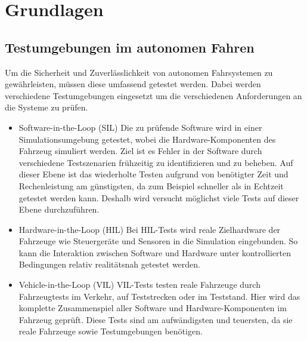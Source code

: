 \chapter{Grundlagen}

\section{Testumgebungen im autonomen Fahren}
Um die Sicherheit und Zuverlässlichkeit von autonomen Fahrsystemen zu gewährleisten, müssen diese umfassend getestet werden. 
Dabei werden verschiedene Testumgebungen eingesetzt um die verschiedenen Anforderungen an die Systeme zu prüfen. 

\begin{itemize}
    \item Software-in-the-Loop (SIL) \newline
            Die zu prüfende Software wird in einer Simulationsumgebung getestet, wobei die Hardware-Komponenten des Fahrzeug simuliert werden. 
            Ziel ist es Fehler in der Software durch verschiedene Testszenarien frühzeitig zu identifizieren und zu beheben.
            Auf dieser Ebene ist das wiederholte Testen aufgrund von benötigter Zeit und Rechenleistung am günstigsten, da zum Beispiel schneller als in Echtzeit getestet werden kann. 
            Deshalb wird versucht möglichst viele Tests auf dieser Ebene durchzuführen.
    \item Hardware-in-the-Loop (HIL) \newline
            Bei HIL-Tests wird reale Zielhardware der Fahrzeuge wie Steuergeräte und Sensoren in die Simulation eingebunden. 
            So kann die Interaktion zwischen Software und Hardware unter kontrollierten Bedingungen relativ realitätsnah getestet werden.
    \item Vehicle-in-the-Loop (VIL) \newline
            VIL-Tests testen reale Fahrzeuge durch Fahrzeugtests im Verkehr, auf Teststrecken oder im Teststand. 
            Hier wird das komplette Zusammenspiel aller Software und Hardware-Komponenten im Fahrzeug geprüft.
            Diese Tests sind am aufwändigsten und teuersten, da sie reale Fahrzeuge sowie Testumgebungen benötigen.
\end{itemize}
